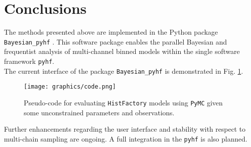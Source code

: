 \section{Conclusions}\label{sec:conclusions}

The methods presented above are implemented in the Python package \texttt{Bayesian\_pyhf} \cite{BayesianPyhf}. This software package enables the parallel Bayesian and frequentist analysis of multi-channel binned models within the single software framework \texttt{pyhf}. \\
The current interface of the package \texttt{Bayesian\_pyhf} is demonstrated in Fig. \ref{code}. 
    \begin{figure} %
        \centering
        \texttt{[image: graphics/code.png]}
        \centering
        \caption{Pseudo-code for evaluating \texttt{HistFactory} models using \texttt{PyMC} given some unconstrained parameters and observations.}
        \label{code}
    \end{figure}
\noindent Further enhancements regarding the user interface and stability with respect to multi-chain sampling are ongoing. A full integration in the \texttt{pyhf} is also planned.